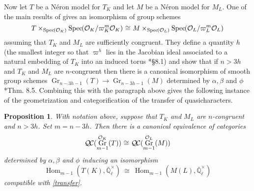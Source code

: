 \documentclass[CM,Submssn,SecEq]{degruyter-crelle} %
\theoremstyle{plain}
\newtheorem{proposition}[theorem]{Proposition}
\theoremstyle{definition}
\theoremstyle{remark}
\newcommand{\EE}{\mathbb{\bar Q}_\ell}
\newcommand{\OK}{\mathcal{O}_K}
\newcommand{\OL}{\mathcal{O}_L}
\newcommand{\EEx}{\EE^\times}
\DeclareMathOperator{\Hom}{Hom}
\DeclareMathOperator{\Gr}{Gr}
\newcommand{\Spec}[1]{{\operatorname{Spec}\hskip-1pt( #1 )}}
\newcommand{\iso}{{\ \cong\ }}
\newcommand{\QC}{{\mathcal{Q\hskip-0.8pt C}}}
\begin{document}
Now let $T$ be a N\'eron model for $T_K$ and let $M$ be a N\'eron model for $M_L$.
One of the main results of \cite{chai-yu:01a} gives an isomorphism of group schemes 
\[
T \times_{\Spec{\OK}} \Spec{\OK/\varpi_K^m\OK} \iso M \times_{\Spec{\OL}} \Spec{\OL/\varpi_L^m\OL}
\] 
assuming that $T_K$ and $M_L$ are sufficiently congruent.
They define a quantity $h$ (the smallest integer so that $\varpi^h$ lies in the
Jacobian ideal associated to a natural embedding of $T_K$ into an induced torus \cite{chai-yu:01a}*{\S 8.1}) and show  that if $n > 3h$ and $T_K$ and $M_L$ are $n$-congruent then there is a canonical isomorphism of smooth group schemes
 $
\Gr_{n-3h-1}(T) \to \Gr_{n-3h-1}(M)
 $
 determined by $\alpha, \beta$ and $\phi$ \cite{chai-yu:01a}*{Thm. 8.5}.
Combining this with the paragraph above gives the following instance of the geometrization and categorification of the transfer of quasicharacters.

\begin{proposition}\label{prop:transfer}
 With notation above, suppose that $T_K$ and $M_L$ are $n$-congruent and $n > 3h$.  Set $m = n-3h$.
 Then there is a canonical equivalence of categories
 \[
 \QC(\Gr^{\OK}_{m-1}(T)) \iso \QC(\Gr^{\OL}_{m-1}(M))
 \]
 determined by $\alpha, \beta$ and $\phi$ inducing an isomorphism
 \[
\Hom_{m-1}(T(K), \EEx) \iso  \Hom_{m-1}(M(L), \EEx)
 \]
compatible with \eqref{transfer}.%
\end{proposition}




\end{document}

